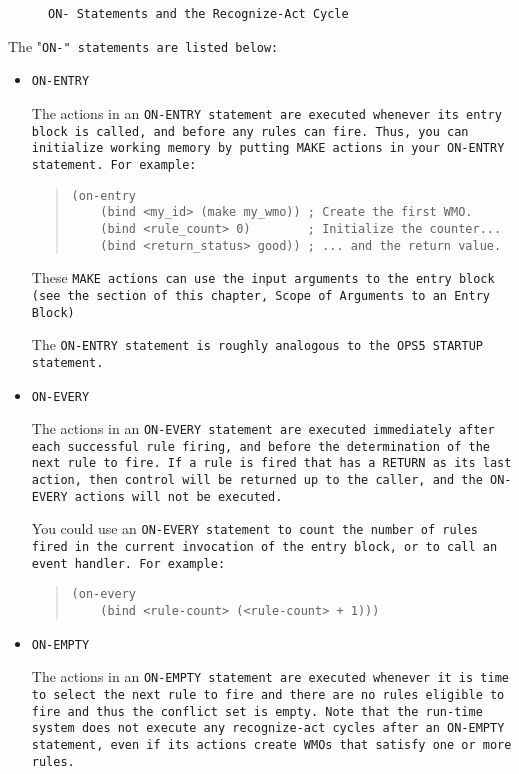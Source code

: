 \begin{figure}[hb]
  \centering
  
  \caption{\tt{ON-} Statements and the Recognize-Act Cycle}
  \label{f:5-2}
\end{figure}

The "\tt{ON-}" statements are listed below:
\begin{itemize}
  \item \tt{ON-ENTRY}

    The actions in an \tt{ON-ENTRY} statement are executed whenever
    its entry block is called, and before any rules can fire.  Thus,
    you can initialize working memory by putting \tt{MAKE} actions in
    your \tt{ON-ENTRY} statement. For example:

    \begin{quote}
\begin{verbatim}
(on-entry
    (bind <my_id> (make my_wmo)) ; Create the first WMO.
    (bind <rule_count> 0)        ; Initialize the counter...
    (bind <return_status> good)) ; ... and the return value.
\end{verbatim}
    \end{quote}

These \tt{MAKE} actions can use the input arguments to the entry block
(see the section of this chapter, Scope of Arguments to an Entry
Block)

The \tt{ON-ENTRY} statement is roughly analogous to the OPS5
\tt{STARTUP} statement.

\item \tt{ON-EVERY}

  The actions in an \tt{ON-EVERY} statement are executed immediately
  after each successful rule firing, and before the determination of
  the next rule to fire. If a rule is fired that has a \tt{RETURN} as
  its last action, then control will be returned up to the caller, and
  the \tt{ON-EVERY} actions will not be executed.

  You could use an \tt{ON-EVERY} statement to count the number of
  rules fired in the current invocation of the entry block, or to call
  an event handler. For example:
  \begin{quote}
\begin{verbatim}
(on-every
    (bind <rule-count> (<rule-count> + 1)))
\end{verbatim}
  \end{quote}
        
\item \tt{ON-EMPTY}

  The actions in an \tt{ON-EMPTY} statement are executed whenever it
  is time to select the next rule to fire and there are no rules
  eligible to fire and thus the conflict set is empty. Note that the
  run-time system does not execute any recognize-act cycles after an
  \tt{ON-EMPTY} statement, even if its actions create WMOs that
  satisfy one or more rules.


\end{itemize}
